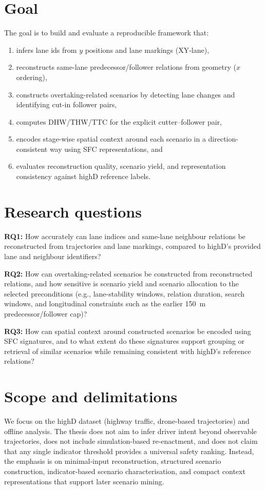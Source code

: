 \documentclass[12pt,a4paper,twoside,openright]{report}
\begin{document}
    \section{Goal}
    The goal is to build and evaluate a reproducible framework that:
    \begin{enumerate}[leftmargin=1.6em]
  \item infers lane ids from $y$ positions and lane markings (XY-lane),
  \item reconstructs same-lane predecessor/follower relations from geometry ($x$ ordering),
  \item constructs overtaking-related scenarios by detecting lane changes and identifying cut-in follower pairs,
  \item computes DHW/THW/TTC for the explicit cutter--follower pair,
  \item encodes stage-wise spatial context around each scenario in a direction-consistent way using SFC representations, and
  \item evaluates reconstruction quality, scenario yield, and representation consistency against highD reference labels.
    \end{enumerate}

    \section{Research questions}
    \textbf{RQ1:} How accurately can lane indices and same-lane neighbour relations be reconstructed from trajectories and lane markings, compared to highD's provided lane and neighbour identifiers?

    \textbf{RQ2:} How can overtaking-related scenarios be constructed from reconstructed relations, and how sensitive is scenario yield and scenario allocation to the selected preconditions (e.g., lane-stability windows, relation duration, search windows, and longitudinal constraints such as the earlier \SI{150}{\meter} predecessor/follower cap)?

    \textbf{RQ3:} How can spatial context around constructed scenarios be encoded using SFC signatures, and to what extent do these signatures support grouping or retrieval of similar scenarios while remaining consistent with highD's reference relations?

    \section{Scope and delimitations}
    We focus on the highD dataset (highway traffic, drone-based trajectories) and offline analysis. The thesis does not aim to infer driver intent beyond observable trajectories, does not include simulation-based re-enactment, and does not claim that any single indicator threshold provides a universal safety ranking. Instead, the emphasis is on minimal-input reconstruction, structured scenario construction, indicator-based scenario characterisation, and compact context representations that support later scenario mining.
\end{document}
